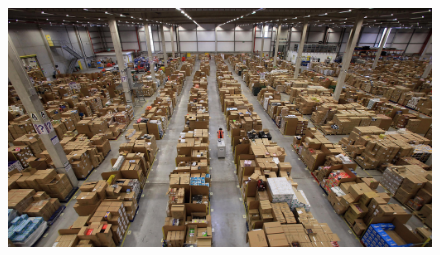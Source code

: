 \documentclass[aspectratio=169]{beamer}
\begin{document}
\begin{frame}[plain]
  \begin{figure}
  \centering
  \vspace*{-1em}
  \hspace*{-3em}
  \includegraphics[height=9.5cm,keepaspectratio]{figures/warehouse.jpg}
  \end{figure}
\end{frame}
\end{document}
